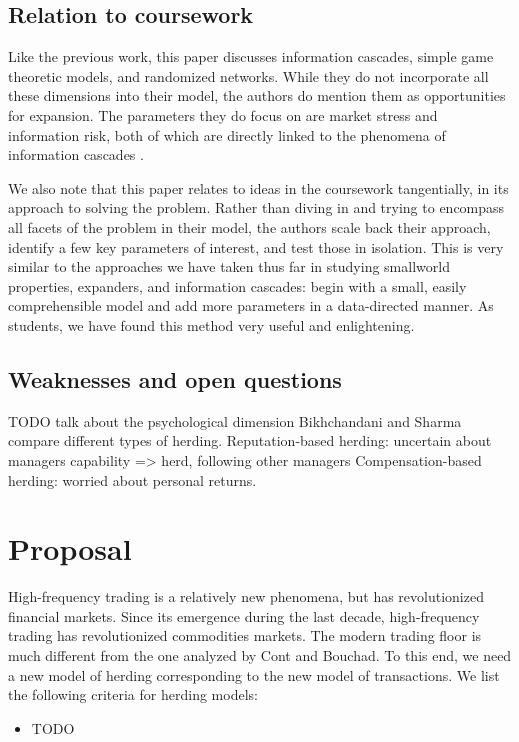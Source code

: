\documentclass{article}
\begin{document}
\subsection{Relation to coursework}
  Like the previous work, this paper discusses information cascades, simple game theoretic models, and randomized networks.
  While they do not incorporate all these dimensions into their model, the authors do mention them as opportunities for expansion.
  The parameters they do focus on are market stress and information risk, both of which are directly linked to the phenomena of information cascades \cite{boortz}.
  
  We also note that this paper relates to ideas in the coursework tangentially, in its approach to solving the problem.
  Rather than diving in and trying to encompass all facets of the problem in their model, the authors scale back their approach, identify a few key parameters of interest, and test those in isolation.
  This is very similar to the approaches we have taken thus far in studying smallworld properties, expanders, and information cascades: begin with a small, easily comprehensible model and add more parameters in a data-directed manner.
  As students, we have found this method very useful and enlightening.

\subsection{Weaknesses and open questions}

TODO talk about the psychological dimension
Bikhchandani and Sharma compare different types of herding. 
Reputation-based herding: uncertain about managers capability => herd, following other managers
Compensation-based herding: worried about personal returns. 


\section{Proposal}

High-frequency trading is a relatively new phenomena, but has revolutionized financial markets. 
Since its emergence during the last decade, high-frequency trading has revolutionized commodities markets.
The modern trading floor is much different from the one analyzed by Cont and Bouchad.
To this end, we need a new model of herding corresponding to the new model of transactions.
We list the following criteria for herding models:
\begin{itemize}
\item 
  TODO
\end{itemize}
\end{document}

